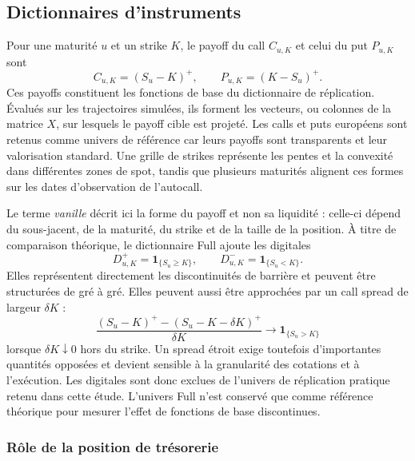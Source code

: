 \documentclass[12pt,a4paper]{article}
\newcommand{\1}{\mathbf{1}}
\begin{document}
\subsection{Dictionnaires d'instruments}

Pour une maturité $u$ et un strike $K$, le payoff du call $C_{u,K}$ et celui
du put $P_{u,K}$ sont
\begin{equation}
 C_{u,K}=(S_u-K)^+,\qquad P_{u,K}=(K-S_u)^+.
\label{eq:vanilla-payoffs}
\end{equation}
Ces payoffs constituent les fonctions de base du dictionnaire de réplication.
Évalués sur les trajectoires simulées, ils forment les vecteurs, ou colonnes de
la matrice $X$, sur lesquels le payoff cible est projeté. Les calls et puts
européens sont retenus comme univers de référence car leurs payoffs sont
transparents et leur valorisation standard. Une grille de strikes représente
les pentes et la convexité dans différentes zones de spot, tandis que plusieurs
maturités alignent ces formes sur les dates d'observation de l'autocall.

Le terme \emph{vanille} décrit ici la forme du payoff et non sa liquidité :
celle-ci dépend du sous-jacent, de la maturité, du strike et de la taille de la
position. À titre de comparaison théorique, le dictionnaire Full ajoute les
digitales
\begin{equation}
 D^+_{u,K}=\1_{\{S_u\geq K\}},\qquad
 D^-_{u,K}=\1_{\{S_u<K\}}.
\label{eq:digital-payoffs}
\end{equation}
Elles représentent directement les discontinuités de barrière et peuvent être
structurées de gré à gré. Elles peuvent aussi être approchées par un call spread
de largeur $\delta K$ :
\begin{equation}
 \frac{(S_u-K)^+-(S_u-K-\delta K)^+}{\delta K}
 \longrightarrow \1_{\{S_u>K\}}
\label{eq:digital-call-spread}
\end{equation}
lorsque $\delta K\downarrow0$ hors du strike. Un spread étroit exige toutefois
d'importantes quantités opposées et devient sensible à la granularité des
cotations et à l'exécution. Les digitales sont donc exclues de l'univers de
réplication pratique retenu dans cette étude. L'univers Full n'est conservé que
comme référence théorique pour mesurer l'effet de fonctions de base
discontinues.

\subsubsection*{Rôle de la position de trésorerie}
\end{document}
